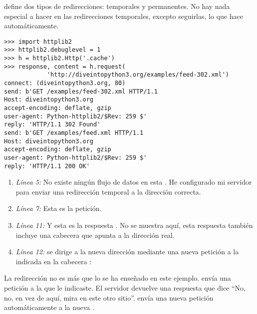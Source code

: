  define dos tipos de redirecciones: temporales y permanentes. No hay nada especial a hacer en las redirecciones temporales, excepto seguirlas, lo que  hace automáticamente.

\noindent\begin{minipage}{\textwidth}
\begin{lstlisting}[mathescape=True]
>>> import httplib2
>>> httplib2.debuglevel = 1
>>> h = httplib2.Http('.cache')
>>> response, content = h.request(
            'http://diveintopython3.org/examples/feed-302.xml')
connect: (diveintopython3.org, 80)
send: b'GET /examples/feed-302.xml HTTP/1.1       
Host: diveintopython3.org
accept-encoding: deflate, gzip
user-agent: Python-httplib2/$Rev: 259 $'
reply: 'HTTP/1.1 302 Found'                      
send: b'GET /examples/feed.xml HTTP/1.1         
Host: diveintopython3.org
accept-encoding: deflate, gzip
user-agent: Python-httplib2/$Rev: 259 $'
reply: 'HTTP/1.1 200 OK'
\end{lstlisting}
\end{minipage}

\begin{enumerate}

\item \emph{Línea 5:} No existe ningún flujo de datos en esta . He configurado mi servidor para enviar una redirección temporal a la dirección correcta.

\item \emph{Línea 7:} Esta es la petición.

\item \emph{Línea 11:} Y esta es la respuesta . No se muestra aquí, esta respuesta también incluye una cabecera  que apunta a la dirección  real. 

\item \emph{Línea 12:}  se dirige a la nueva dirección mediante una nueva petición a la  indicada en la cabecera : 

\end{enumerate}

La redirección no es más que lo se ha enseñado en este ejemplo.  envía una petición a la  que le indicaste. El servidor devuelve una respuesta que dice ``No, no, en vez de aquí, mira en este otro sitio''.  envía una nueva petición automáticamente a la nueva .

